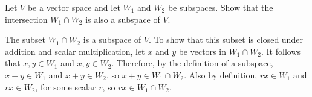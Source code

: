 \documentclass{ximera}
\begin{document}
\begin{exercise} \label{c5.1.6}
Let $V$ be a vector space and let $W_1$ and $W_2$ be subspaces.
Show that the intersection $W_1\cap W_2$ is also a subspace of $V$.

\begin{solution}

The subset $W_1 \cap W_2$ is a subspace of $V$.  To show that this
subset is closed under addition and scalar multiplication, 
let $x$ and $y$ be vectors in $W_1 \cap W_2$.  It follows that
$x,y \in W_1$ and $x,y \in W_2$.  Therefore, by the
definition of a subspace, $x + y \in W_1$ and $x + y \in W_2$, so
$x + y \in W_1 \cap W_2$.  Also by definition, $rx \in W_1$ and
$rx \in W_2$, for some scalar $r$, so $rx \in W_1 \cap W_2$.

\end{solution}
\end{exercise}
\end{document}
